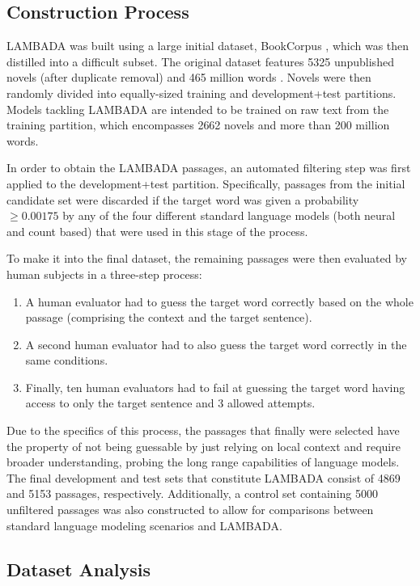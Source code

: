 \subsection{Construction Process}

LAMBADA was built using a large initial dataset, BookCorpus , which was then distilled into a difficult subset. The original dataset features 5325 unpublished novels (after duplicate removal) and 465 million words \cite{zhu2015aligning}. Novels were then randomly divided into equally-sized training and development+test partitions. Models tackling LAMBADA are intended to be trained on raw text from the training partition, which encompasses 2662 novels and more than 200 million words.

In order to obtain the LAMBADA passages, an automated filtering step was first applied to the development+test partition. Specifically, passages from the initial candidate set were discarded if the target word was given a probability $\geq 0.00175$ by any of the four different standard language models (both neural and count based) that were used in this stage of the process.

To make it into the final dataset, the remaining passages were then evaluated by human subjects in a three-step process:

\begin{enumerate}
	\item A human evaluator had to guess the target word correctly based on the whole passage (comprising the context and the target sentence).
	\item A second human evaluator had to also guess the target word correctly in the same conditions.
	\item Finally, ten human evaluators had to fail at guessing the target word having access to only the target sentence and 3 allowed attempts.
\end{enumerate}

Due to the specifics of this process, the passages that finally were selected have the property of not being guessable by just relying on local context and require broader understanding, probing the long range capabilities of language models. The final development and test sets that constitute LAMBADA consist of 4869 and 5153 passages, respectively. Additionally, a control set containing 5000 unfiltered passages was also constructed to allow for comparisons between standard language modeling scenarios and LAMBADA.

\subsection{Dataset Analysis}

